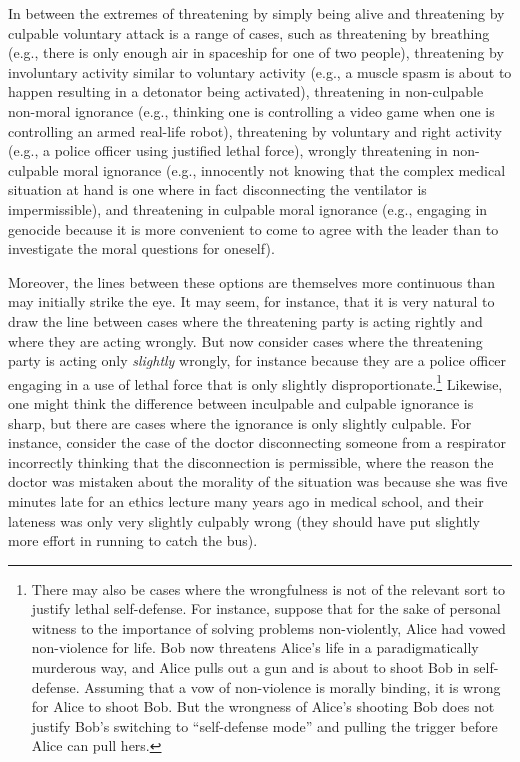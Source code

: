 In between the extremes of threatening by simply being alive and threatening by culpable voluntary attack is a range of cases, 
such as threatening by breathing (e.g., there is only enough air in spaceship for one of two people), threatening
by involuntary activity similar to voluntary activity (e.g., a muscle spasm is about to happen resulting in a detonator 
being activated), threatening in non-culpable non-moral ignorance (e.g., thinking one is controlling a video game when one is controlling an armed real-life robot), threatening by voluntary and right activity (e.g., a police officer using justified lethal force), wrongly threatening in non-culpable moral ignorance (e.g., innocently not knowing that the complex medical situation at hand is one where in fact disconnecting the ventilator is impermissible), and threatening in culpable moral ignorance (e.g., engaging in genocide because
it is more convenient to come to agree with the leader than to investigate the moral questions for oneself). 

Moreover, the lines between these options are themselves more continuous than may initially strike the eye. It may seem, for instance,
that it is very natural to draw the line between cases where the threatening party is acting rightly and where they are
acting wrongly. But now consider cases where the threatening party is acting only \textit{slightly} wrongly, for instance 
because they are a police officer engaging in a use of lethal force that is only slightly disproportionate.\footnote{There may
also be cases where the wrongfulness is not of the relevant sort to justify lethal self-defense. For instance, suppose that 
for the sake of personal witness to the importance of solving problems non-violently, Alice had vowed non-violence for life. Bob now threatens Alice's 
life in a paradigmatically murderous way, and Alice pulls out a gun and is about to shoot Bob in self-defense. Assuming that a vow of non-violence is morally 
binding, it is wrong for Alice to shoot Bob. But the wrongness of Alice's shooting Bob does not justify Bob's switching 
to ``self-defense mode'' and pulling the trigger before Alice can pull hers.} Likewise, one might think the difference between
inculpable and culpable ignorance is sharp, but there are cases where the ignorance is only slightly culpable. For instance, 
consider the case of the doctor disconnecting someone from a respirator incorrectly thinking that the disconnection is permissible,
where the reason the doctor was mistaken about the morality of the situation was because she was five minutes late for an 
ethics lecture many years ago in medical school, and their lateness was only very slightly culpably wrong (they should have 
put slightly more effort in running to catch the bus). 


